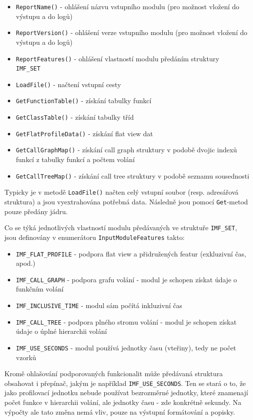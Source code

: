 \documentclass[czech,BP]{thesiskiv}
\begin{document}
\begin{itemize}
\item \texttt{ReportName()} - ohlášení názvu vstupního modulu (pro možnost vložení do výstupu a do logů)
\item \texttt{ReportVersion()} - ohlášení verze vstupního modulu (pro možnost vložení do výstupu a do logů)
\item \texttt{ReportFeatures()} - ohlášení vlastností modulu předáním struktury\\ \texttt{IMF\_SET}
\item \texttt{LoadFile()} - načtení vstupní cesty
\item \texttt{GetFunctionTable()} - získání tabulky funkcí
\item \texttt{GetClassTable()} - získání tabulky tříd
\item \texttt{GetFlatProfileData()} - získání flat view dat
\item \texttt{GetCallGraphMap()} - získání call graph struktury v podobě dvojic indexů funkcí z tabulky funkcí a počtem volání
\item \texttt{GetCallTreeMap()} - získání call tree struktury v podobě seznamu sousednosti
\end{itemize}

Typicky je v metodě \texttt{LoadFile()} načten celý vstupní soubor (resp. adresářová struktura) a jsou vyextrahována potřebná data. Následně jsou pomocí \texttt{Get}-metod pouze předány jádru.

Co se týká jednotlivých vlastností modulu předávaných ve struktuře \texttt{IMF\_SET}, jsou definovány v enumerátoru \texttt{InputModuleFeatures} takto:

\begin{itemize}
\item \texttt{IMF\_FLAT\_PROFILE} - podpora flat view a přidružených featur (exkluzivní čas, apod.)
\item \texttt{IMF\_CALL\_GRAPH} - podpora grafu volání - modul je schopen získat údaje o funkčním volání
\item \texttt{IMF\_INCLUSIVE\_TIME} - modul sám počítá inkluzivní čas
\item \texttt{IMF\_CALL\_TREE} - podpora plného stromu volání - modul je schopen získat údaje o úplné hierarchii volání
\item \texttt{IMF\_USE\_SECONDS} - modul používá jednotky času (vteřiny), tedy ne počet vzorků
\end{itemize}

Kromě ohlašování podporovaných funkcionalit může předávaná struktura obsahovat i přepínač, jakým je například \texttt{IMF\_USE\_SECONDS}. Ten se stará o to, že jako profilovací jednotku nebude používat bezrozměrné jednotky, které znamenají počet  funkce v hierarchii volání, ale jednotky času - zde konkrétně sekundy. Na výpočty ale tato změna nemá vliv, pouze na výstupní formátování a popisky.
\end{document}
